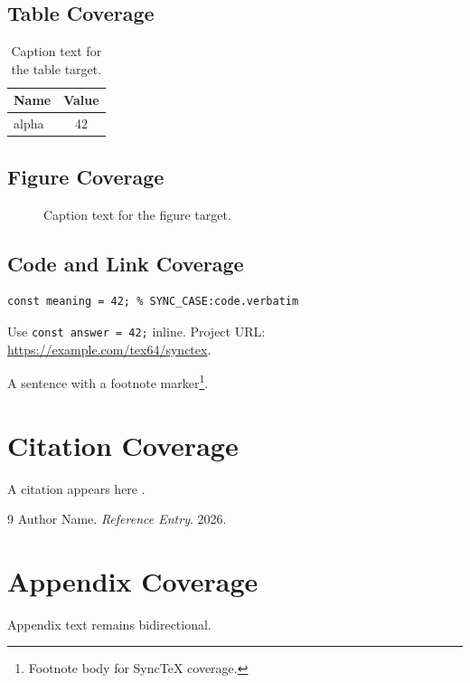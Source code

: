 \documentclass{article}
\begin{document}
\subsection{Table Coverage}
\begin{table}[h]
\centering
\begin{tabular}{|l|c|}
\hline
Name & Value \\ %
\hline
alpha & 42 \\ %
\hline
\end{tabular}
\caption{Caption text for the table target.} %
\end{table}

\subsection{Figure Coverage}
\begin{figure}[h]
\centering
\fbox{\rule{6cm}{3cm}} %
\caption{Caption text for the figure target.} %
\end{figure}

\subsection{Code and Link Coverage}
\begin{verbatim}
const meaning = 42; % SYNC_CASE:code.verbatim
\end{verbatim}
Use \texttt{const answer = 42;} inline. %
Project URL: \url{https://example.com/tex64/synctex}. %

A sentence with a footnote marker\footnote{Footnote body for SyncTeX coverage.}. %

\section{Citation Coverage}
A citation appears here \cite{ref:one}. %

\begin{thebibliography}{9}
Author Name.
\textit{Reference Entry}.
2026. %
\end{thebibliography}

\appendix
\section{Appendix Coverage} %
Appendix text remains bidirectional. %
\end{document}
